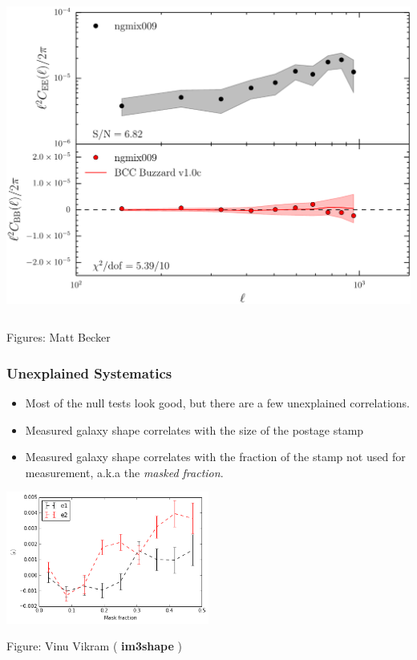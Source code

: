 \documentclass{beamer}
\newcommand{\imshape}{ {\bf im3shape} }
\begin{document}
{\begin{columns}
        \begin{column}{0.5\textwidth}
            \begin{center}
                \includegraphics[width=1.05\textwidth]{ngmix009_eb_crop.pdf}
            \end{center}
        \end{column}

    \end{columns}
    {\tiny Figures: Matt Becker}
}

\frame
{
    \frametitle{Unexplained Systematics}

    \begin{itemize}

        \item Most of the null tests look good, but there are a few unexplained
            correlations.

        \item Measured galaxy shape correlates with the size of the postage stamp
    
         \item Measured galaxy shape correlates with the fraction of the stamp
             not used for measurement, a.k.a the {\em masked fraction}.

     \end{itemize}

    \begin{center}
        \includegraphics[width=0.5\textwidth]{im3shape-v-vs-mask-frac.png}
    \end{center}

     {\tiny Figure: Vinu Vikram (\imshape)}
}
\end{document}

